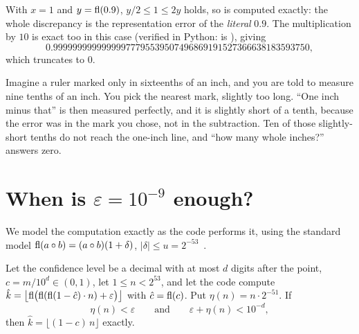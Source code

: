 With $x=1$ and $y=\mathrm{fl}(0.9)$, $y/2\le1\le2y$ holds, so  is computed exactly: the whole discrepancy is the
representation error of the \emph{literal} $0.9$. The multiplication by $10$ is exact too in this case (verified in Python:
 is ), giving
\[ 0.99999999999999977795539507496869191527366638183593750, \]
which  truncates to $0$.

\begin{layman}
Imagine a ruler marked only in sixteenths of an inch, and you are told to measure nine tenths of an inch. You pick the
nearest mark, slightly too long. ``One inch minus that'' is then measured perfectly, and it is slightly short of a tenth,
because the error was in the mark you chose, not in the subtraction. Ten of those slightly-short tenths do not reach the
one-inch line, and ``how many whole inches?'' answers zero.
\end{layman}

\section{When is \texorpdfstring{$\varepsilon=10^{-9}$}{epsilon = 1e-9} enough?}
We model the computation exactly as the code performs it, using the standard model
$\mathrm{fl}(a\circ b)=(a\circ b)(1+\delta)$, $|\delta|\le u=2^{-53}$~\cite{goldberg1991what,higham2002accuracy}.

\begin{theorem}\label{thm:epsfloor}
Let the confidence level be a decimal with at most $d$ digits after the point, $c=m/10^d\in(0,1)$, let
$1\le n<2^{53}$, and let the code compute $\hat k=\bigl\lfloor\mathrm{fl}\bigl(\mathrm{fl}(\mathrm{fl}(1-\hat c)\cdot n)+\varepsilon\bigr)\bigr\rfloor$
with $\hat c=\mathrm{fl}(c)$. Put $\eta(n)=n\cdot2^{-51}$. If
\[ \eta(n)<\varepsilon \qquad\text{and}\qquad \varepsilon+\eta(n)<10^{-d}, \]
then $\hat k=\lfloor(1-c)\,n\rfloor$ exactly.
\end{theorem}

